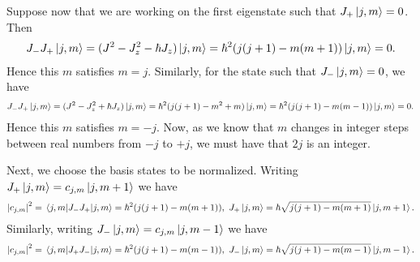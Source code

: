 Suppose now that we are working on the first eigenstate such that $J_{+}\ket{j, m} = 0$. Then
\begin{align*}
	J_{-}J_{+}\ket{j, m} = (J^{2} - J_{z}^{2} - \hbar J_{z})\ket{j, m} = \hbar^{2}(j(j + 1) - m(m + 1))\ket{j, m} = 0.
\end{align*}
Hence this $m$ satisfies $m = j$. Similarly, for the state such that $J_{-}\ket{j, m} = 0$, we have
\begin{align*}
	J_{-}J_{+}\ket{j, m} = (J^{2} - J_{z}^{2} + \hbar J_{z})\ket{j, m} = \hbar^{2}(j(j + 1) - m^{2} + m)\ket{j, m} = \hbar^{2}(j(j + 1) - m(m - 1))\ket{j, m} = 0.
\end{align*}
Hence this $m$ satisfies $m = -j$. Now, as we know that $m$ changes in integer steps between real numbers from $-j$ to $+j$, we must have that $2j$ is an integer.

Next, we choose the basis states to be normalized. Writing $J_{+}\ket{j, m} = c_{j, m}\ket{j, m + 1}$ we have
\begin{align*}
	\abs{c_{j, m}}^{2} = \expval{J_{-}J_{+}}{j, m} = \hbar^{2}(j(j + 1) - m(m + 1)),\ J_{+}\ket{j, m} = \hbar\sqrt{j(j + 1) - m(m + 1)}\ket{j, m + 1}.
\end{align*}
Similarly, writing $J_{-}\ket{j, m} = c_{j, m}\ket{j, m - 1}$ we have
\begin{align*}
	\abs{c_{j, m}}^{2} = \expval{J_{+}J_{-}}{j, m} = \hbar^{2}(j(j + 1) - m(m - 1)),\ J_{-}\ket{j, m} = \hbar\sqrt{j(j + 1) - m(m - 1)}\ket{j, m - 1}.
\end{align*}

